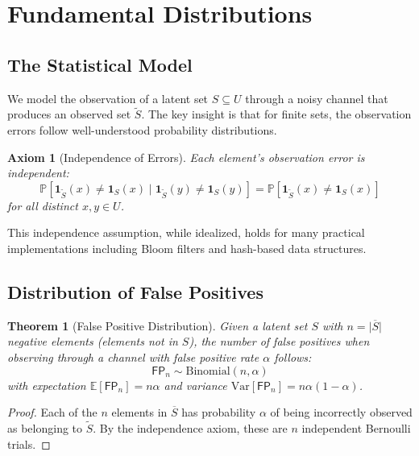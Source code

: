\documentclass[11pt,final,hidelinks]{article}
\newtheorem{theorem}{Theorem}[section]
\newtheorem{axiom}{Axiom}
\newcommand{\obs}[1]{\widetilde{#1}}  %
\newcommand{\SetIndicator}[1]{\mathbf{1}_{#1}}
\newcommand{\SetComplement}[1]{\overline{#1}}
\newcommand{\Card}[1]{\lvert#1\rvert}
\newcommand{\Prob}[1]{\mathbb{P}\left[#1\right]}
\newcommand{\ProbCond}[2]{\mathbb{P}\left[#1 \mid #2\right]}
\newcommand{\Expect}[1]{\mathbb{E}\left[#1\right]}
\newcommand{\Var}[1]{\mathrm{Var}\left[#1\right]}
\newcommand{\FP}{\mathsf{FP}}  %
\newcommand{\fprate}{\alpha}
\newcommand{\Binomial}[2]{\mathrm{Binomial}(#1, #2)}
\begin{document}
\section{Fundamental Distributions}

\subsection{The Statistical Model}

We model the observation of a latent set $S \subseteq U$ through a noisy channel that produces an observed set $\obs{S}$. The key insight is that for finite sets, the observation errors follow well-understood probability distributions.

\begin{axiom}[Independence of Errors]
Each element's observation error is independent:
\begin{equation}
\ProbCond{\SetIndicator{\obs{S}}(x) \neq \SetIndicator{S}(x)}{\SetIndicator{\obs{S}}(y) \neq \SetIndicator{S}(y)} = 
\Prob{\SetIndicator{\obs{S}}(x) \neq \SetIndicator{S}(x)}
\end{equation}
for all distinct $x, y \in U$.
\end{axiom}

This independence assumption, while idealized, holds for many practical implementations including Bloom filters and hash-based data structures.

\subsection{Distribution of False Positives}

\begin{theorem}[False Positive Distribution]
\label{thm:fp-dist}
Given a latent set $S$ with $n = \Card{\SetComplement{S}}$ negative elements (elements not in $S$), the number of false positives when observing through a channel with false positive rate $\fprate$ follows:
\begin{equation}
\FP_n \sim \Binomial{n}{\fprate}
\end{equation}
with expectation $\Expect{\FP_n} = n\fprate$ and variance $\Var{\FP_n} = n\fprate(1-\fprate)$.
\end{theorem}

\begin{proof}
Each of the $n$ elements in $\SetComplement{S}$ has probability $\fprate$ of being incorrectly observed as belonging to $\obs{S}$. By the independence axiom, these are $n$ independent Bernoulli trials.
\end{proof}
\end{document}
